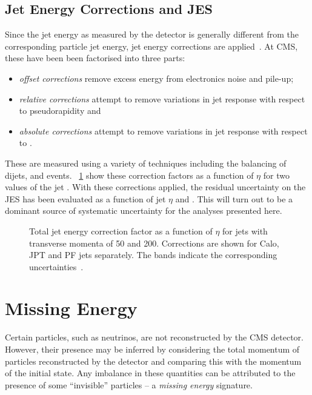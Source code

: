 \subsection{Jet Energy Corrections and \acl{JES}}
Since the jet energy as measured by the detector is generally different from the
corresponding particle jet energy, jet energy corrections are
applied~\cite{jet_energy_cms, jet_energy_pas}. At \ac{CMS}, these have been been
factorised into three parts:
\begin{itemize}
\item \emph{offset corrections} remove excess energy from electronics noise and
  pile-up;
\item \emph{relative corrections} attempt to remove variations in jet response
  with respect to pseudorapidity and
\item \emph{absolute corrections} attempt to remove variations in jet response
  with respect to \Pt.
\end{itemize}
These are measured using a variety of techniques including the balancing of
dijets, \gammajets and \Zjets events. \figs~\ref{fig:reco_jet_energy_corr}
show these correction factors as a function of $\eta$ for two values of the jet
\Pt. With these corrections applied, the residual uncertainty on the \ac{JES}
has been evaluated as a function of jet $\eta$ and \Pt. This will turn out to be
a dominant source of systematic uncertainty for the analyses presented here.

\begin{figure}
  \centering
  \quad
  \quad
  \caption[Total jet energy correction factor as a function of $\eta$ for jets
  with transverse momenta of \unit{50}{\GeV} and \unit{200}{\GeV}]{Total jet
    energy correction factor as a function of $\eta$ for jets with transverse
    momenta of \unit{50}{\GeV} and \unit{200}{\GeV}. Corrections are shown for
    \ac{Calo}, \ac{JPT} and \ac{PF} jets separately. The bands indicate the
    corresponding uncertainties~\cite{jet_energy_pas}.}
  \label{fig:reco_jet_energy_corr}
\end{figure}

\section{Missing Energy}
Certain particles, such as neutrinos, are not reconstructed by the \ac{CMS}
detector. However, their presence may be inferred by considering the total
momentum of particles reconstructed by the detector and comparing this with the
momentum of the initial state. Any imbalance in these quantities can be
attributed to the presence of some ``invisible'' particles -- a \emph{missing
  energy} signature.

